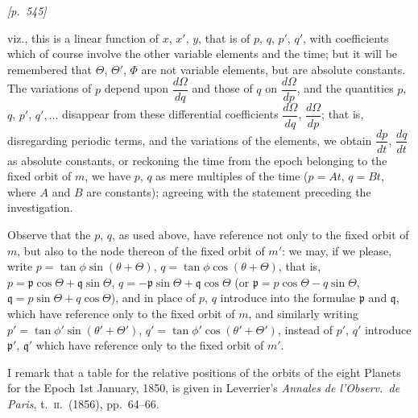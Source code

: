 \documentclass[11pt]{article}
\begin{document}

\bigskip
\noindent\textit{[p.~545]}

\medskip

viz., this is a linear function of $x$, $x'$, $y$, that is of $p$, $q$,
$p'$, $q'$, with coefficients which of course involve the other variable
elements and the time; but it will be remembered that $\Theta$,
$\Theta'$, $\Phi$ are not variable elements, but are absolute constants.
The variations of $p$ depend upon $\dfrac{d\Omega}{dq}$ and those of $q$
on $\dfrac{d\Omega}{dp}$, and the quantities $p$, $q$, $p'$, $q',\ldots$
disappear from these differential coefficients $\dfrac{d\Omega}{dq}$,
$\dfrac{d\Omega}{dp}$; that is, disregarding periodic terms, and the
variations of the elements, we obtain $\dfrac{dp}{dt}$, $\dfrac{dq}{dt}$
as absolute constants, or reckoning the time from the epoch belonging to
the fixed orbit of $m$, we have $p$, $q$ as mere multiples of the time
($p=At$, $q=Bt$, where $A$ and $B$ are constants); agreeing with the
statement preceding the investigation.

\medskip

Observe that the $p$, $q$, as used above, have reference not only to the
fixed orbit of $m$, but also to the node thereon of the fixed orbit of
$m'$: we may, if we please, write
$p=\tan\phi\sin(\theta+\Theta)$, $q=\tan\phi\cos(\theta+\Theta)$, that is,
$p=\mathfrak{p}\cos\Theta+\mathfrak{q}\sin\Theta$,
$q=-\mathfrak{p}\sin\Theta+\mathfrak{q}\cos\Theta$
(or $\mathfrak{p}=p\cos\Theta-q\sin\Theta$,
$\mathfrak{q}=p\sin\Theta+q\cos\Theta$), and in place of $p$, $q$
introduce into the formulae $\mathfrak{p}$ and $\mathfrak{q}$, which
have reference only to the fixed orbit of $m$, and similarly writing
$p'=\tan\phi'\sin(\theta'+\Theta')$,
$q'=\tan\phi'\cos(\theta'+\Theta')$, instead of $p'$, $q'$ introduce
$\mathfrak{p}'$, $\mathfrak{q}'$ which have reference only to the fixed
orbit of $m'$.

\medskip

I remark that a table for the relative positions of the orbits of the
eight Planets for the Epoch 1st January, 1850, is given in Leverrier's
\textit{Annales de l'Observ.\ de Paris}, t.~\textsc{ii}.\ (1856),
pp.~64--66.

\end{document}
